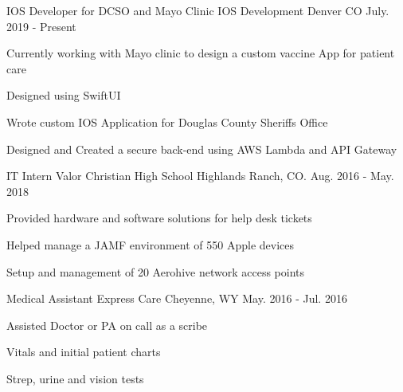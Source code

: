\vspace{-2.0mm}

\begin{cventries}
  \cventry
    {IOS Developer for DCSO and Mayo Clinic} %
    {IOS Development} %
    {Denver CO} %
    {July. 2019 - Present} %
    {
      \begin{cvitems} %
        \item {Currently working with Mayo clinic to design a custom vaccine App for patient care}
        \item {Designed using SwiftUI}
        \item {Wrote custom IOS Application for Douglas County Sheriffs Office}
        \item {Designed and Created a secure back-end using AWS Lambda and API Gateway}
        \end{cvitems}
}
  \cventry
    {IT Intern} %
    {Valor Christian High School} %
    {Highlands Ranch, CO.} %
    {Aug. 2016 - May. 2018} %
    {
      \begin{cvitems} %
        \item {Provided hardware and software solutions for help desk tickets}
        \item {Helped manage a JAMF environment of 550 Apple devices}
        \item {Setup and management of 20 Aerohive network access points}
      \end{cvitems}
    }

  \cventry
    {Medical Assistant} %
    {Express Care} %
    {Cheyenne, WY} %
    {May. 2016 - Jul. 2016} %
    {
      \begin{cvitems} %
        \item {Assisted Doctor or PA on call as a scribe}
        \item {Vitals and initial patient charts}
        \item {Strep, urine and vision tests}
      \end{cvitems}
    }




\end{cventries}
